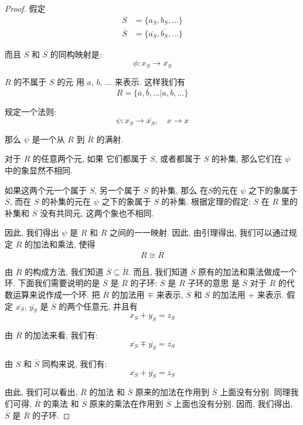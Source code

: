 \documentclass[utf8]{ctexbook}
\theoremstyle{definition}
\begin{document}
\begin{proof}
假定
\begin{align*}
S & = \{a_S, b_S, \ldots \} \\
\overline{S} & = \{ \overline{a_S}, \overline{b_S}, \ldots \}
\end{align*}

而且 $S$ 和 $\overline{S}$ 的同构映射是:
$$ \phi : x_S \longrightarrow \overline{x_S} $$

$R$ 的不属于 $S$ 的元 用 $a$, $b$, $\ldots$ 来表示. 这样我们有
\begin{equation}
R = \{ \overline{a}, \overline{b}, \ldots | a, b, \ldots \}
\end{equation}

规定一个法则:
\begin{equation}
\psi : x_S \longrightarrow \overline{x_S}, \quad x \longrightarrow x 
\end{equation}

那么 $\psi$ 是一个从 $R$ 到 $\overline{R}$ 的满射. 

对于 $R$ 的任意两个元, 如果 它们都属于 $S$, 或者都属于 $S$ 的补集, 那么它们在 $\psi$ 中的象显然不相同.

如果这两个元一个属于 $S$, 另一个属于 $S$ 的补集, 那么 在$S$的元在 $\psi$ 之下的象属于 $\overline{S}$, 而在 $S$ 的补集的元在 $\psi$ 之下的象属于 $S$ 的补集. 根据定理的假定: $S$ 在 $R$ 里的补集和 $\overline{S}$ 没有共同元, 这两个象也不相同.

因此, 我们得出 $\psi$ 是 $R$ 和 $\overline{R}$ 之间的一一映射. 因此, 由引理得出, 我们可以通过规定 $\overline{R}$ 的加法和乘法, 使得
\begin{equation}
R \cong \overline{R} \nonumber
\end{equation}

由 $\overline{R}$ 的构成方法, 我们知道 $\overline{S} \subseteq \overline{R}$. 而且, 我们知道 $\overline{S}$ 原有的加法和乘法做成一个环. 下面我们需要说明的是 $\overline{S}$ 是 $\overline{R}$ 的子环: $\overline{S}$ 是 $\overline{R}$ 子环的意思 是 $\overline{S}$ 对于 $\overline{R}$ 的代数运算来说作成一个环. 把 $\overline{R}$ 的加法用 $\mp$ 来表示, $\overline{S}$ 和 $S$ 的加法用 $+$ 来表示. 假定 $\overline{x_S}$, $\overline{y_S}$ 是 $\overline{S}$ 的两个任意元, 并且有
\begin{equation}
x_S + y_S = z_S 
\end{equation}

由 $\overline{R}$ 的加法来看, 我们有:
\begin{equation}
\overline{x_S} \mp \overline{y_S} = \overline{z_S}
\end{equation}

由 $S$ 和 $\overline{S}$ 同构来说, 我们有:
\begin{equation}
\overline{x_S} + \overline{y_S} = \overline{z_S}
\end{equation}

由此, 我们可以看出, $\overline{R}$ 的加法 和 $\overline{S}$ 原来的加法在作用到 $\overline{S}$ 上面没有分别. 同理我们可得, $\overline{R}$ 的乘法 和 $\overline{S}$ 原来的乘法在作用到 $\overline{S}$ 上面也没有分别. 因而, 我们得出, $\overline{S}$ 是 $\overline{R}$ 的子环.
\end{proof}
\end{document}
